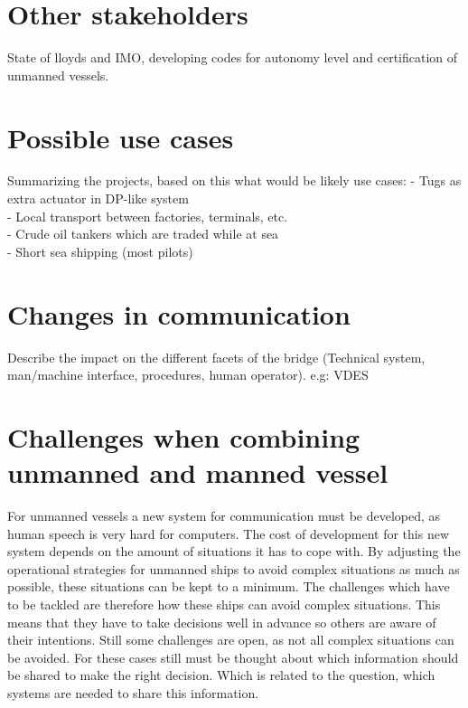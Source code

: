 \section{Other stakeholders}
State of lloyds and IMO, developing codes for autonomy level and certification of unmanned vessels.

\section{Possible use cases}
Summarizing the projects, based on this what would be likely use cases:
- Tugs as extra actuator in DP-like system \\
- Local transport between factories, terminals, etc. \\
- Crude oil tankers which are traded while at sea \\
- Short sea shipping (most pilots) \\

\section{Changes in communication}
Describe the impact on the different facets of the bridge (Technical system, man/machine interface, procedures, human operator).
e.g: VDES

\section{Challenges when combining unmanned and manned vessel}
\label{sec:challenges-future}
For unmanned vessels a new system for communication must be developed, as human speech is very hard for computers. The cost of development for this new system depends on the amount of situations it has to cope with. By adjusting the operational strategies for unmanned ships to avoid complex situations as much as possible, these situations can be kept to a minimum. 
The challenges which have to be tackled are therefore how these ships can avoid complex situations. This means that they have to take decisions well in advance so others are aware of their intentions. Still some challenges are open, as not all complex situations can be avoided. For these cases still must be thought about which information should be shared to make the right decision. Which is related to the question, which systems are needed to share this information.
















